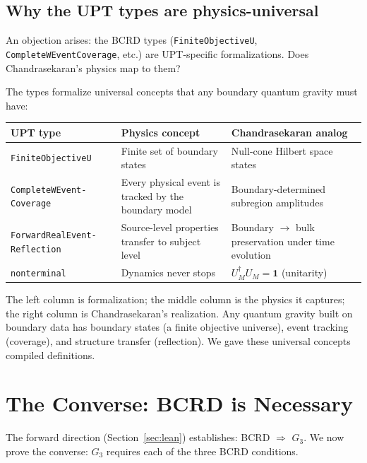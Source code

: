 \documentclass[11pt,a4paper]{article}
\theoremstyle{definition}
\theoremstyle{remark}
\begin{document}
\subsection{Why the UPT types are physics-universal}\label{sec:types}

An objection arises: the BCRD types (\texttt{FiniteObjectiveU}, \texttt{CompleteWEventCoverage}, etc.) are UPT-specific formalizations. Does Chandrasekaran's physics map to them?

The types formalize universal concepts that any boundary quantum gravity must have:

\begin{center}
\begin{tabular}{p{4.0cm}p{4.5cm}p{4.5cm}}
\toprule
\textbf{UPT type} & \textbf{Physics concept} & \textbf{Chandrasekaran analog} \\
\midrule
\texttt{FiniteObjectiveU} & Finite set of boundary states & Null-cone Hilbert space states \\
\texttt{CompleteWEvent-Coverage} & Every physical event is tracked by the boundary model & Boundary-determined subregion amplitudes \\
\texttt{ForwardRealEvent-Reflection} & Source-level properties transfer to subject level & Boundary $\to$ bulk preservation under time evolution \\
\texttt{nonterminal} & Dynamics never stops & $U_M^\dagger U_M = \mathbf{1}$ (unitarity) \\
\bottomrule
\end{tabular}
\end{center}

The left column is formalization; the middle column is the physics it captures; the right column is Chandrasekaran's realization. Any quantum gravity built on boundary data has boundary states (a finite objective universe), event tracking (coverage), and structure transfer (reflection). We gave these universal concepts compiled definitions.

\section{The Converse: BCRD is Necessary}\label{sec:converse}

The forward direction (Section~\ref{sec:lean}) establishes: BCRD $\Rightarrow$ $G_3$. We now prove the converse: $G_3$ requires each of the three BCRD conditions.
\end{document}
